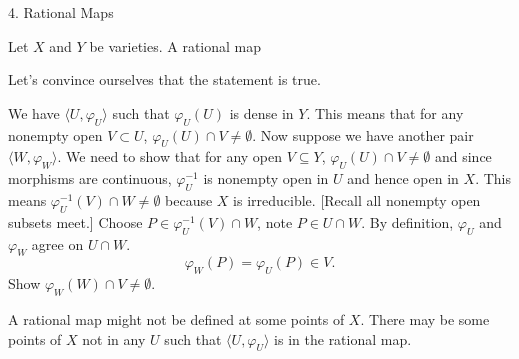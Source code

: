 4. Rational Maps






\begin{dfn}
Let $X$ and $Y$ be varieties. A rational map 
\end{dfn}


















































Let's convince ourselves that the statement is true.

We have $\langle U, \varphi_U \rangle$ such that $\varphi_U(U)$ is dense in $Y$. This means that for any nonempty open $V \subset U$, $\varphi_U(U) \cap V \neq \emptyset$. Now suppose we have another pair $\langle W, \varphi_W \rangle$. We need to show that for any open $V \subseteq Y$, $\varphi_U(U) \cap V \neq \emptyset$ and since morphisms are continuous, $\varphi_U^{-1}$ is nonempty open in $U$  and hence open in $X$. This means $\varphi_U^{-1}(V) \cap W \neq \emptyset$ because $X$ is irreducible. [Recall all nonempty open subsets meet.] Choose $P \in \varphi_U^{-1}(V) \cap W$, note $P \in U \cap W$. By definition, $\varphi_U$ and $\varphi_W$ agree on $U \cap W$. 
	\[
	\varphi_W(P)= \varphi_U(P) \in V.
	\]
Show $\varphi_W(W) \cap V \neq \emptyset$.


A rational map might not be defined at some points of $X$. There may be some points of $X$ not in any $U$ such that $\langle U, \varphi_U \rangle$ is in the rational map. 


